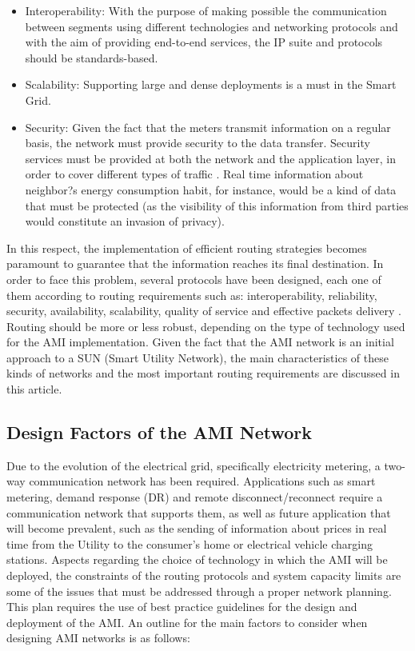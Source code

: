\documentclass[11pt,final,onecolumn]{IEEEtran}
\begin{document}
\begin{itemize}
\item Interoperability: With the purpose of making possible the communication between segments using different technologies and networking protocols and with the aim of providing end-to-end services, the IP suite and protocols should be standards-based.
\item Scalability: Supporting large and dense deployments is a must in the Smart Grid. 
\item Security: Given the fact that the meters transmit information on a regular basis, the network must provide security to the data transfer. Security services must be provided at both the network and the application layer, in order to cover different types of traffic  \cite{Bennett2008}. Real time information about neighbor?s energy consumption habit, for instance, would be a kind of data that must be protected (as the visibility of this information from third parties would constitute an invasion of privacy).
\end{itemize}

In this respect, the implementation of efficient routing strategies becomes paramount to guarantee that the information reaches its final destination. In order to face this problem, several protocols have been designed, each one of them according to routing requirements such as: interoperability, reliability, security, availability, scalability, quality of service and effective packets delivery  \cite{Iyer2011a}. Routing should be more or less robust, depending on the type of technology used for the AMI implementation. Given the fact that the AMI network is an initial approach to a SUN (Smart Utility Network), the main characteristics of these kinds of networks and the most important routing requirements are discussed in this article. 



\subsection{Design Factors of the AMI Network}\label{designFactors}

Due to the evolution of the electrical grid, specifically electricity metering, a two-way communication network has been required. Applications such as smart metering, demand response (DR) and remote disconnect/reconnect require a communication network that supports them, as well as future application that will become prevalent, such as the sending of information about prices in real time from the Utility to the consumer’s home or electrical vehicle charging stations.  
Aspects regarding the choice of technology in which the AMI will be deployed, the constraints of the routing protocols and system capacity limits are some of the issues that must be addressed through a proper network planning. This plan requires the use of best practice guidelines for the design and deployment of the AMI. An outline for the main factors to consider when designing AMI networks is as follows:
\end{document}
